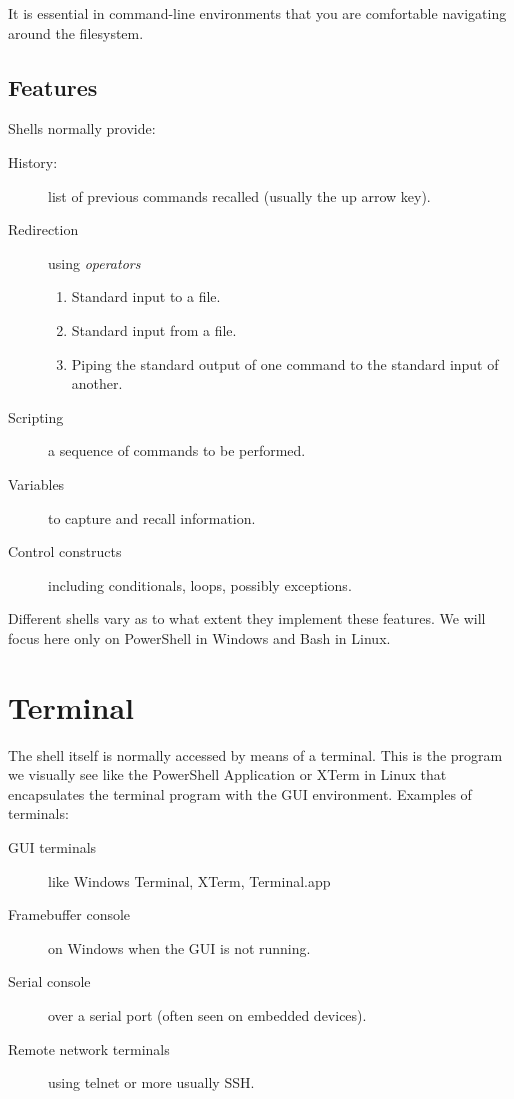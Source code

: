 It is essential in command-line environments that you are comfortable navigating around the filesystem.

\subsection{Features}

Shells normally provide:

\begin{description}
\item[History:] list of previous commands recalled (usually the up arrow key).
\item[Redirection] using \textit{operators}
  \begin{enumerate}
  \item Standard input to a file.  
  \item Standard input from a file.
  \item Piping the standard output of one command to the standard input of another.
  \end{enumerate}
\item[Scripting] a sequence of commands to be performed.
\item[Variables] to capture and recall information.
\item[Control constructs] including conditionals, loops, possibly exceptions.
\end{description}

Different shells vary as to what extent they implement these features.
We will focus here only on PowerShell in Windows and Bash in Linux. 

\section{Terminal}

The shell itself is normally accessed by means of a terminal.
This is the program we visually see like the PowerShell Application or XTerm in Linux that encapsulates the terminal program with the GUI environment.
Examples of terminals:

\begin{description}
\item[GUI terminals ] like Windows Terminal, XTerm, Terminal.app
\item[Framebuffer console] on Windows when the GUI is not running.
\item[Serial console] over a serial port (often seen on embedded devices).
\item[Remote network terminals] using telnet or more usually SSH.
\end{description}

